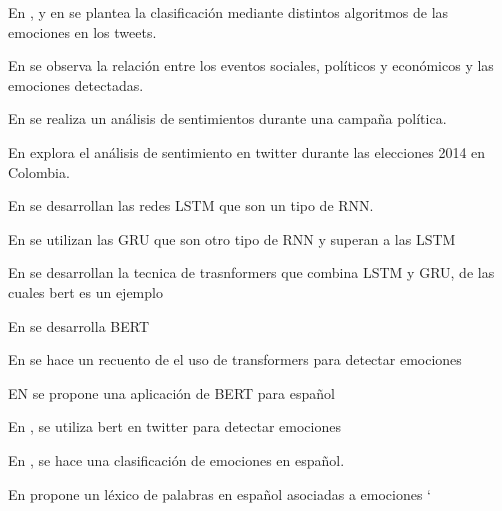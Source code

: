 En  , \cite{wang2012harnessing}y en \cite{roberts2012empatweet} se plantea la clasificación mediante distintos algoritmos de las emociones en los tweets.



En \cite{bollen2011modeling} se observa la relación entre los eventos sociales, políticos y económicos y las emociones detectadas.

En \cite{tumasjan2010predicting} se realiza un análisis de sentimientos durante una campaña política.

En \cite{ceron2016sentiment} explora el análisis de sentimiento en twitter durante las elecciones 2014 en Colombia.

En \cite{hochreiter1997long} se desarrollan las redes LSTM que son un tipo de RNN.

En \cite{chung2014empirical} se utilizan las GRU que son otro tipo de RNN y superan a las LSTM

En \cite{vaswani2017attention} se desarrollan la tecnica de trasnformers que combina LSTM y GRU, de las cuales bert es un ejemplo

En \cite{devlin2018bert} se desarrolla BERT

En \cite{acheampong2021transformer} se hace un recuento de el uso de transformers para detectar emociones

EN \cite{canete2020spanish} se propone una aplicación de BERT para español

En \cite{gonzalez2021twilbert}, \cite{huang2019ana} se utiliza bert en twitter para  detectar emociones

En \cite{plaza2020improved}, \cite{gil2013combining} se hace una clasificación de emociones en español.


En \cite{sidorov2012empirical} propone un léxico de palabras en español asociadas a emociones
`








